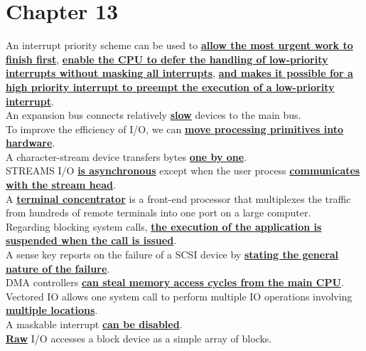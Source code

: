 \documentclass[10pt]{article}
\newcommand{\qw}[1]{\textbf{\ul{#1}}}
\begin{document}
\section*{\centering Chapter 13}
An interrupt priority scheme can be used to \qw{allow the most urgent work to finish first}, \qw{enable the CPU to defer the handling of low-priority interrupts without masking all interrupts}, \qw{and makes it possible for a high priority interrupt to preempt the execution of a low-priority interrupt}.\\[2mm]
An expansion bus connects relatively \qw{slow} devices to the main bus.\\[2mm]
To improve the efficiency of I/O, we can \qw{move processing primitives into hardware}.\\[2mm]
A character-stream device transfers bytes \qw{one by one}.\\[2mm]
STREAMS I/O \qw{is asynchronous} except when the user process \qw{communicates with the stream head}.\\[2mm]
A \qw{terminal concentrator} is a front-end processor that multiplexes the traffic from hundreds of remote terminals into one port on a large computer.\\[2mm]
Regarding blocking system calls, \qw{the execution of the application is suspended when the call is issued}.\\[2mm]
A sense key reports on the failure of a SCSI device by \qw{stating the general nature of the failure}.\\[2mm]
DMA controllers \qw{can steal memory access cycles from the main CPU}.\\[2mm]
Vectored IO allows one system call to perform multiple IO operations involving \qw{multiple locations}.\\[2mm]
A maskable interrupt \qw{can be disabled}.\\[2mm]
\qw{Raw} I/O accesses a block device as a simple array of blocks.
\newpage
\end{document}
